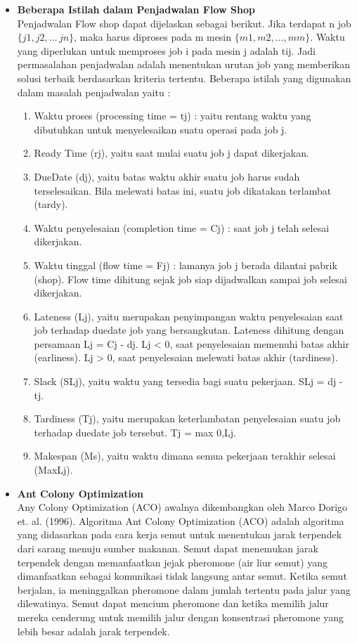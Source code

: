 \documentclass[a4paper,twoside]{article}
\begin{document}
\begin{enumerate}
		\begin{itemize}
		\item{\bf Beberapa Istilah dalam Penjadwalan Flow Shop}\\
		Penjadwalan Flow shop dapat dijelaskan sebagai berikut. Jika terdapat n job $\{j1, j2, \dots\, jn\}$, maka harus diproses pada m mesin $\{m1, m2, \dots, mm\}$. Waktu yang diperlukan untuk memproses job i pada mesin j adalah tij. Jadi permasalahan penjadwalan adalah menentukan urutan job yang memberikan solusi terbaik berdasarkan kriteria tertentu. Beberapa istilah yang digunakan dalam masalah penjadwalan yaitu :
		\begin{enumerate}
		\item Waktu proses (processing time = tj) : yaitu rentang waktu yang dibutuhkan untuk menyelesaikan suatu operasi pada job j.
		\item Ready Time (rj), yaitu saat mulai suatu job j dapat dikerjakan.
		\item DueDate (dj), yaitu batas waktu akhir suatu job harus sudah terselesaikan. Bila melewati batas ini, suatu job dikatakan terlambat (tardy).
		\item Waktu penyelesaian (completion time = Cj) : saat job j telah selesai dikerjakan.
		\item Waktu tinggal (flow time = Fj) : lamanya job j berada dilantai pabrik (shop). Flow time dihitung sejak job siap dijadwalkan sampai job selesai dikerjakan.
		\item Lateness (Lj), yaitu merupakan penyimpangan waktu penyelesaian saat job terhadap duedate job yang bersangkutan. Lateness dihitung dengan persamaan Lj = Cj - dj.
		Lj < 0, saat penyelesaian memenuhi batas akhir (earliness).
		Lj > 0, saat penyelesaian melewati batas akhir (tardiness).
		\item Slack (SLj), yaitu waktu yang tersedia bagi suatu pekerjaan.
		SLj = dj - tj.
		\item Tardiness (Tj), yaitu merupakan keterlambatan penyelesaian suatu job  terhadap duedate job tersebut.
		Tj = max {0,Lj}.
		\item Makespan (Ms), yaitu waktu dimana semua pekerjaan terakhir selesai (MaxLj).
		\end{enumerate}
		\end{itemize}	
		
		\begin{itemize}
		\item{\bf Ant Colony Optimization}\\
		Any Colony Optimization (ACO) awalnya dikembangkan oleh Marco Dorigo et. al. (1996). Algoritma Ant Colony Optimization (ACO) adalah algoritma yang didasarkan pada cara kerja semut untuk menentukan jarak terpendek dari sarang menuju sumber makanan. Semut dapat menemukan jarak terpendek dengan memanfaatkan jejak pheromone (air liur semut) yang dimanfaatkan sebagai komunikasi tidak langsung antar semut. Ketika semut berjalan, ia meninggalkan pheromone dalam jumlah tertentu pada jalur yang dilewatinya. Semut dapat mencium pheromone dan ketika memilih jalur mereka cenderung untuk memilih jalur dengan konsentrasi pheromone yang lebih besar adalah jarak terpendek.
		

\end{itemize}
\end{enumerate}
\end{document}
